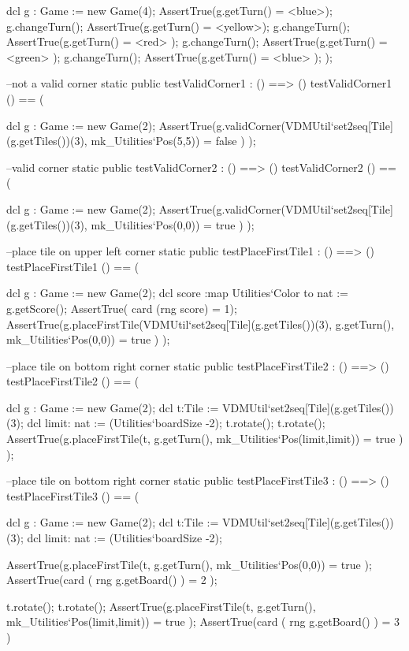 \begin{vdm_al}
    dcl g : Game := new Game(4);
    AssertTrue(g.getTurn() = <blue>);
    g.changeTurn();
    AssertTrue(g.getTurn() = <yellow>);
    g.changeTurn();
    AssertTrue(g.getTurn() = <red> );
    g.changeTurn();
    AssertTrue(g.getTurn() = <green> );
    g.changeTurn();
    AssertTrue(g.getTurn() = <blue> );
  );
  
  --not a valid corner
  static public testValidCorner1 : () ==> ()
  testValidCorner1 () == (
    
    dcl g : Game := new Game(2);
    AssertTrue(g.validCorner(VDMUtil`set2seq[Tile](g.getTiles())(3), mk_Utilities`Pos(5,5)) = false )
  );
  
  --valid corner
  static public testValidCorner2 : () ==> ()
  testValidCorner2 () == (
    
    dcl g : Game := new Game(2);
    AssertTrue(g.validCorner(VDMUtil`set2seq[Tile](g.getTiles())(3), mk_Utilities`Pos(0,0)) = true )
  );
  
  --place tile on upper left corner
  static public testPlaceFirstTile1 : () ==> ()
  testPlaceFirstTile1 () == (
    
    dcl g : Game := new Game(2);
    dcl score :map Utilities`Color to nat := g.getScore();
    AssertTrue( card (rng score) = 1);
    AssertTrue(g.placeFirstTile(VDMUtil`set2seq[Tile](g.getTiles())(3), g.getTurn(),
              mk_Utilities`Pos(0,0)) = true )
  );
  
  --place tile on bottom right corner
  static public testPlaceFirstTile2 : () ==> ()
  testPlaceFirstTile2 () == (
    
    dcl g : Game := new Game(2);
    dcl t:Tile := VDMUtil`set2seq[Tile](g.getTiles())(3);
    dcl limit: nat := (Utilities`boardSize -2);
    t.rotate();
    t.rotate();
    AssertTrue(g.placeFirstTile(t, g.getTurn(), mk_Utilities`Pos(limit,limit)) = true )
  );
  
  --place tile on bottom right corner
  static public testPlaceFirstTile3 : () ==> ()
  testPlaceFirstTile3 () == (
    
    dcl g : Game := new Game(2);
    dcl t:Tile := VDMUtil`set2seq[Tile](g.getTiles())(3);
    dcl limit: nat := (Utilities`boardSize -2);
    
    AssertTrue(g.placeFirstTile(t, g.getTurn(), mk_Utilities`Pos(0,0)) = true );
    AssertTrue(card ( rng g.getBoard() ) = 2 );
    
    t.rotate();
    t.rotate();
    AssertTrue(g.placeFirstTile(t, g.getTurn(), mk_Utilities`Pos(limit,limit)) = true );
    AssertTrue(card ( rng g.getBoard() ) = 3 )
    

\end{vdm_al}
